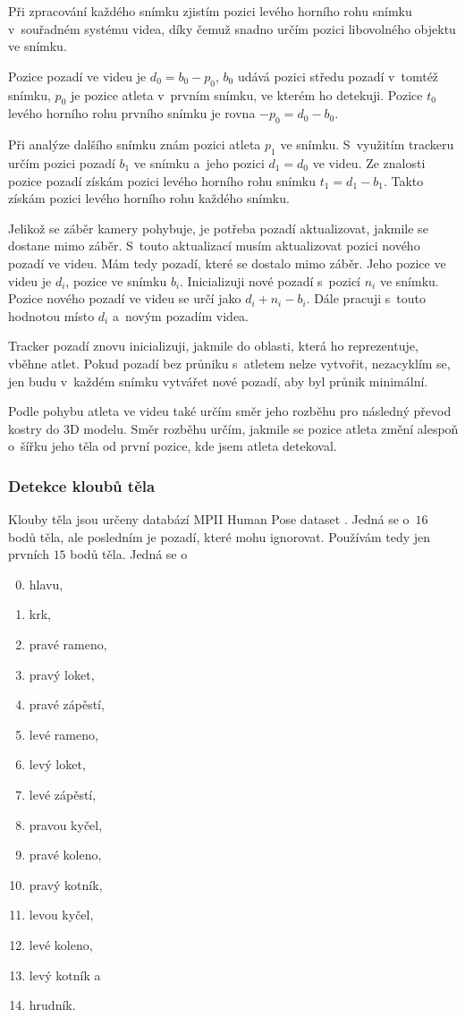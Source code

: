 Při zpracování každého snímku zjistím pozici levého horního rohu snímku v~souřadném systému videa, díky čemuž snadno určím pozici libovolného objektu ve snímku.

Pozice pozadí ve videu je $d_0=b_0-p_0$, $b_0$ udává pozici středu pozadí v~tomtéž snímku, $p_0$ je pozice atleta v~prvním snímku, ve kterém ho detekuji. Pozice $t_0$ levého horního rohu prvního snímku je rovna $-p_0=d_0-b_0$.

Při analýze dalšího snímku znám pozici atleta $p_1$ ve snímku. S~využitím trackeru určím pozici pozadí $b_1$ ve snímku a~jeho pozici $d_1=d_0$ ve videu. Ze znalosti pozice pozadí získám pozici levého horního rohu snímku $t_1=d_1-b_1$. Takto získám pozici levého horního rohu každého snímku.

Jelikož se záběr kamery pohybuje, je potřeba pozadí aktualizovat, jakmile se dostane mimo záběr. S~touto aktualizací musím aktualizovat pozici nového pozadí ve videu. Mám tedy pozadí, které se dostalo mimo záběr. Jeho pozice ve videu je $d_i$, pozice ve snímku $b_i$. Inicializuji nové pozadí s~pozicí $n_i$ ve snímku. Pozice nového pozadí ve videu se určí jako $d_i+n_i-b_i$. Dále pracuji s~touto hodnotou místo $d_i$ a~novým pozadím videa.

Tracker pozadí znovu inicializuji, jakmile do oblasti, která ho reprezentuje, vběhne atlet. Pokud pozadí bez průniku s~atletem nelze vytvořit, nezacyklím se, jen budu v~každém snímku vytvářet nové pozadí, aby byl průnik minimální.

Podle pohybu atleta ve videu také určím směr jeho rozběhu pro následný převod kostry do 3D modelu. Směr rozběhu určím, jakmile se pozice atleta změní alespoň o~šířku jeho těla od první pozice, kde jsem atleta detekoval.


\subsubsection{Detekce kloubů těla}

Klouby těla jsou určeny databází MPII Human Pose dataset \citep{MPIIHPE}. Jedná se o~$16$ bodů těla, ale posledním je pozadí, které mohu ignorovat. Používám tedy jen prvních $15$ bodů těla. Jedná se o
\begin{enumerate}
    \setcounter{enumi}{-1}
    \item hlavu,
    \item krk,
    \item pravé rameno,
    \item pravý loket,
    \item pravé zápěstí,
    \item levé rameno,
    \item levý loket,
    \item levé zápěstí,
    \item pravou kyčel,
    \item pravé koleno,
    \item pravý kotník,
    \item levou kyčel,
    \item levé koleno,
    \item levý kotník a
    \item hrudník.
\end{enumerate}

